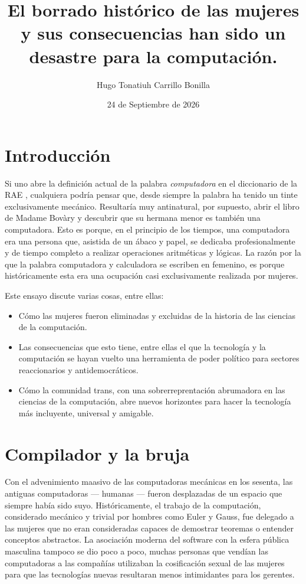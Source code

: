 \documentclass{article}
\title{El borrado histórico de las mujeres y sus consecuencias han sido un desastre para la computación.}
\author{Hugo Tonatiuh Carrillo Bonilla}
\date{24 de Septiembre de 2026}
\begin{document}
\maketitle
\section*{Introducción}
	Si uno abre la definición actual de la palabra \textit{computadora} en el diccionario de la RAE \autocite{rae}, cualquiera podría pensar que, desde siempre la palabra ha tenido un tinte exclusivamente mecánico. Resultaría muy antinatural, por supuesto, abrir el libro de Madame Bovàry y descubrir que su hermana menor es también una computadora. Esto es porque, en el principio de los tiempos, una computadora era una persona que, asistida de un ábaco y papel, se dedicaba profesionalmente y de tiempo completo a realizar operaciones aritméticas y lógicas. La razón por la que la palabra computadora y calculadora se escriben en femenino, es porque históricamente esta era una ocupación casi exclusivamente realizada por mujeres.

	Este ensayo discute varias cosas, entre ellas:
	\begin{itemize}
		\item Cómo las mujeres fueron eliminadas y excluidas de la historia de las ciencias de la computación.
		\item Las consecuencias que esto tiene, entre ellas el que la tecnología y la computación se hayan vuelto una herramienta de poder político para sectores reaccionarios y antidemocráticos.
		\item Cómo la comunidad trans, con una sobrerreprentación abrumadora en las ciencias de la computación, abre nuevos horizontes para hacer la tecnología más incluyente, universal y amigable.
	\end{itemize}
\section*{Compilador y la bruja}
	Con el advenimiento maasivo de las computadoras mecánicas en los sesenta, las antiguas computadoras --- humanas --- fueron desplazadas de un espacio que siempre había sido suyo. Históricamente, el trabajo de la computación, considerado mecánico y trivial por hombres como Euler y Gauss, fue delegado a las mujeres que no eran consideradas capaces de demostrar teoremas o entender conceptos abstractos. La asociación moderna del software con la esfera pública masculina tampoco se dio poco a poco, muchas personas que vendían las computadoras a las compañías utilizaban la cosificación sexual de las mujeres para que las tecnologías nuevas resultaran menos intimidantes para los gerentes. \cite{guardian}
\end{document}

